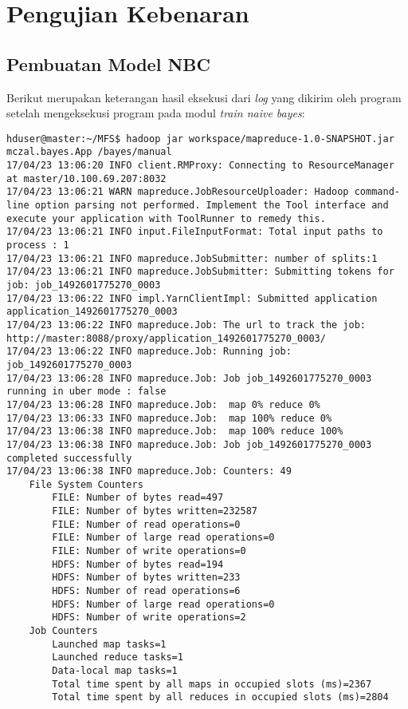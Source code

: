 \chapter{Pengujian Kebenaran}
\label{lamp:D}

\section{Pembuatan Model NBC}
Berikut merupakan keterangan hasil eksekusi dari \textit{log} yang dikirim oleh program setelah mengeksekusi program pada modul \textit{train naive bayes}:
\begin{lstlisting}
hduser@master:~/MFS$ hadoop jar workspace/mapreduce-1.0-SNAPSHOT.jar mczal.bayes.App /bayes/manual
17/04/23 13:06:20 INFO client.RMProxy: Connecting to ResourceManager at master/10.100.69.207:8032
17/04/23 13:06:21 WARN mapreduce.JobResourceUploader: Hadoop command-line option parsing not performed. Implement the Tool interface and execute your application with ToolRunner to remedy this.
17/04/23 13:06:21 INFO input.FileInputFormat: Total input paths to process : 1
17/04/23 13:06:21 INFO mapreduce.JobSubmitter: number of splits:1
17/04/23 13:06:21 INFO mapreduce.JobSubmitter: Submitting tokens for job: job_1492601775270_0003
17/04/23 13:06:22 INFO impl.YarnClientImpl: Submitted application application_1492601775270_0003
17/04/23 13:06:22 INFO mapreduce.Job: The url to track the job: http://master:8088/proxy/application_1492601775270_0003/
17/04/23 13:06:22 INFO mapreduce.Job: Running job: job_1492601775270_0003
17/04/23 13:06:28 INFO mapreduce.Job: Job job_1492601775270_0003 running in uber mode : false
17/04/23 13:06:28 INFO mapreduce.Job:  map 0% reduce 0%
17/04/23 13:06:33 INFO mapreduce.Job:  map 100% reduce 0%
17/04/23 13:06:38 INFO mapreduce.Job:  map 100% reduce 100%
17/04/23 13:06:38 INFO mapreduce.Job: Job job_1492601775270_0003 completed successfully
17/04/23 13:06:38 INFO mapreduce.Job: Counters: 49
	File System Counters
		FILE: Number of bytes read=497
		FILE: Number of bytes written=232587
		FILE: Number of read operations=0
		FILE: Number of large read operations=0
		FILE: Number of write operations=0
		HDFS: Number of bytes read=194
		HDFS: Number of bytes written=233
		HDFS: Number of read operations=6
		HDFS: Number of large read operations=0
		HDFS: Number of write operations=2
	Job Counters 
		Launched map tasks=1
		Launched reduce tasks=1
		Data-local map tasks=1
		Total time spent by all maps in occupied slots (ms)=2367
		Total time spent by all reduces in occupied slots (ms)=2804

\end{lstlisting}

